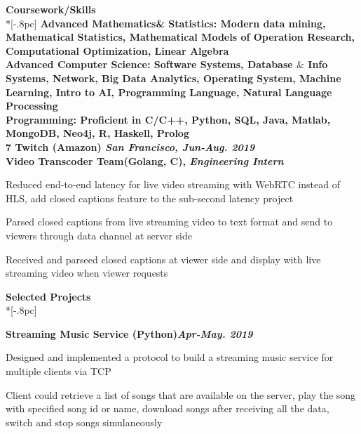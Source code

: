 {\large \bf Coursework/Skills} \\*[-.8pc]
\underline{\hspace{7in}} 
\bf Advanced Mathematics\& Statistics: \rm  Modern data mining, Mathematical Statistics, Mathematical Models of Operation Research, Computational Optimization, Linear Algebra\\
\bf Advanced Computer Science: \rm  Software Systems, Database $\&$ Info Systems, Network, Big Data Analytics, Operating System, Machine Learning, Intro to AI, Programming Language, Natural Language Processing\\
\bf Programming: \rm Proficient in C/C++, Python, SQL, Java, Matlab,  MongoDB, Neo4j, R, Haskell, Prolog\\


7\underline{\hspace{7in}} 
{\bf Twitch (Amazon) \hfill \it  San Francisco, Jun-Aug. 2019}\\

\vspace{-4mm}
 \rm  Video Transcoder Team(Golang, C), \it Engineering Intern \rm 
\begin{list2}

\item Reduced end-to-end latency for live video streaming with WebRTC instead of HLS, add closed captions feature to the sub-second latency project
\item Parsed closed captions from live streaming video to text format and send to viewers through data channel at server side
\item Received and parseed closed captions at viewer side and display with live streaming video when viewer requests\\
\end{list2}



{\large \bf Selected Projects} \\*[-.8pc]
\underline{\hspace{7in}} 

\bf Streaming Music Service (Python)\hfill{\it Apr-May. 2019}\rm\\
\vspace{-4mm}
\begin{list2}
\item Designed and implemented a protocol to build a streaming music service for multiple clients via TCP
\item Client could retrieve a list of songs that are available on the server, play the song with specified song id or name, download songs after receiving all the data, switch and stop songs
simulaneously
\end{list2}




